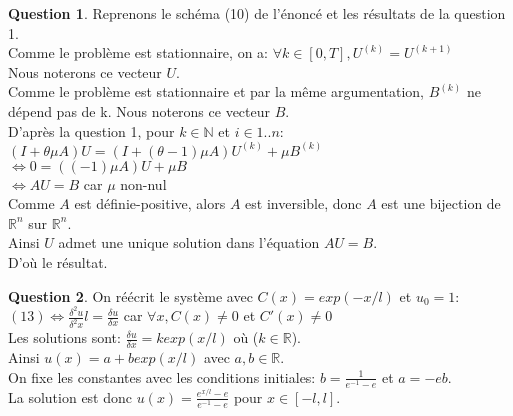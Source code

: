 \documentclass[a4paper]{article}
\theoremstyle{definition}
\newtheorem{que}{Question}
\begin{document}
	\setcounter{que}{5}
	\begin{que}
		Reprenons le schéma (10) de l'énoncé et les résultats de la question 1. \\

		Comme le problème est stationnaire, on a: $\forall k \in [0, T],  U^{(k)}=U^{(k+1)}$ \\
		Nous noterons ce vecteur $U$. \\

		Comme le problème est stationnaire et par la même argumentation, $B^{(k)}$ ne dépend pas de k. Nous noterons ce vecteur $B$. \\

		D'après la question 1, pour $k \in \mathbb{N}$ et $i \in 1..n$: \\
		$(I + \theta \mu A)U = (I + (\theta - 1) \mu A)U^{(k)} + \mu B^{(k)}$ \\
		$\Leftrightarrow 0 = (( - 1) \mu A)U + \mu B$ \\
		$\Leftrightarrow AU = B$ car $\mu$ non-nul \\
		Comme $A$ est définie-positive, alors $A$ est inversible, donc $A$ est une bijection de $\mathbb{R}^n$ sur $\mathbb{R}^n$. \\
		Ainsi $U$ admet une unique solution dans l'équation $AU=B$.\\
		D'où le résultat. \\
	\end{que}
	\begin{que}
		On réécrit le système avec $C(x)=exp(-x/l)$ et $u_0 = 1$: \\
		$(13) \Leftrightarrow \frac{\delta^2 u}{\delta^2 x} l = \frac{\delta u }{\delta x}$ car $\forall x, C(x) \ne 0$ et $C'(x) \ne 0$\\
		Les solutions sont: $ \frac{\delta u }{\delta x} = k exp(x/l)$ où ($k \in \mathbb{R}$). \\
		Ainsi $u(x) = a + b exp(x/l)$ avec $a, b \in \mathbb{R}$. \\
		On fixe les constantes avec les conditions initiales: $b=\frac{1}{e^{-1}-e}$ et $a=-eb$. \\
		La solution est donc $u(x)=\frac{e^{x/l}-e}{e^{-1}-e}$ pour $x \in [-l, l]$.\\
	\end{que}
\end{document}

